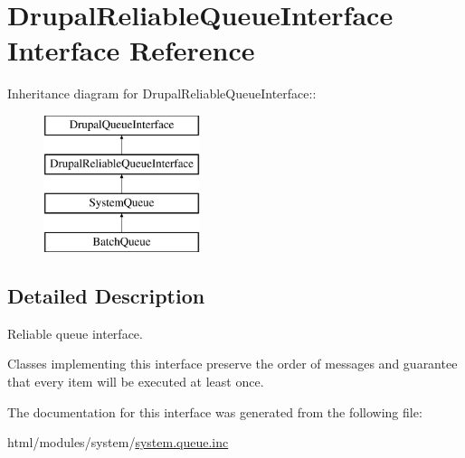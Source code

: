 \hypertarget{interfaceDrupalReliableQueueInterface}{
\section{DrupalReliableQueueInterface Interface Reference}
\label{interfaceDrupalReliableQueueInterface}
}
Inheritance diagram for DrupalReliableQueueInterface::\begin{figure}[H]
\begin{center}
\leavevmode
\includegraphics[height=4cm]{interfaceDrupalReliableQueueInterface}
\end{center}
\end{figure}


\subsection{Detailed Description}
Reliable queue interface.

Classes implementing this interface preserve the order of messages and guarantee that every item will be executed at least once. 

The documentation for this interface was generated from the following file:\begin{DoxyCompactItemize}
\item 
html/modules/system/\hyperlink{system_8queue_8inc}{system.queue.inc}\end{DoxyCompactItemize}
